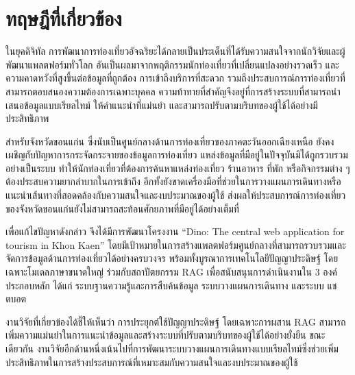 
\section{ทฤษฎีที่เกี่ยวข้อง}

ในยุคดิจิทัล การพัฒนาการท่องเที่ยวอัจฉริยะได้กลายเป็นประเด็นที่ได้รับความสนใจจากนักวิจัยและผู้พัฒนาแพลตฟอร์มทั่วโลก อันเป็นผลมาจากพฤติกรรมนักท่องเที่ยวที่เปลี่ยนแปลงอย่างรวดเร็ว และความคาดหวังที่สูงขึ้นต่อข้อมูลที่ถูกต้อง การเข้าถึงบริการที่สะดวก รวมถึงประสบการณ์การท่องเที่ยวที่สามารถตอบสนองความต้องการเฉพาะบุคคล \parencite{sousa2024} ความท้าทายที่สำคัญจึงอยู่ที่การสร้างระบบที่สามารถนำเสนอข้อมูลแบบเรียลไทม์ ให้คำแนะนำที่แม่นยำ และสามารถปรับตามบริบทของผู้ใช้ได้อย่างมีประสิทธิภาพ

สำหรับจังหวัดขอนแก่น ซึ่งนับเป็นศูนย์กลางด้านการท่องเที่ยวของภาคตะวันออกเฉียงเหนือ ยังคงเผชิญกับปัญหาการกระจัดกระจายของข้อมูลการท่องเที่ยว แหล่งข้อมูลที่มีอยู่ในปัจจุบันมิได้ถูกรวบรวมอย่างเป็นระบบ ทำให้นักท่องเที่ยวที่ต้องการค้นหาแหล่งท่องเที่ยว ร้านอาหาร ที่พัก หรือกิจกรรมต่าง ๆ ต้องประสบความยากลำบากในการเข้าถึง อีกทั้งยังขาดเครื่องมือที่ช่วยในการวางแผนการเดินทางหรือแนะนำเส้นทางที่สอดคล้องกับความสนใจและงบประมาณของผู้ใช้ ส่งผลให้ประสบการณ์การท่องเที่ยวของจังหวัดขอนแก่นยังไม่สามารถสะท้อนศักยภาพที่มีอยู่ได้อย่างเต็มที่

เพื่อแก้ไขปัญหาดังกล่าว จึงได้มีการพัฒนาโครงงาน ``Dino: The central web application for tourism in Khon Kaen'' โดยมีเป้าหมายในการสร้างแพลตฟอร์มศูนย์กลางที่สามารถรวบรวมและจัดการข้อมูลด้านการท่องเที่ยวได้อย่างครบวงจร พร้อมทั้งบูรณาการเทคโนโลยีปัญญาประดิษฐ์ โดยเฉพาะโมเดลภาษาขนาดใหญ่ ร่วมกับสถาปัตยกรรม RAG เพื่อสนับสนุนการดำเนินงานใน 3 องค์ประกอบหลัก ได้แก่ ระบบฐานความรู้และการสืบค้นข้อมูล ระบบวางแผนการเดินทาง และระบบ แชตบอต

งานวิจัยที่เกี่ยวข้องได้ชี้ให้เห็นว่า การประยุกต์ใช้ปัญญาประดิษฐ์ โดยเฉพาะการผสาน RAG สามารถเพิ่มความแม่นยำในการแนะนำข้อมูลและสร้างระบบที่ปรับตามบริบทของผู้ใช้ได้อย่างยั่งยืน \parencite{banerjee2025} ขณะเดียวกัน งานวิจัยอีกด้านหนึ่งเน้นไปที่การพัฒนาระบบวางแผนการเดินทางแบบเรียลไทม์ซึ่งช่วยเพิ่มประสิทธิภาพในการสร้างประสบการณ์ที่เหมาะสมกับความสนใจและงบประมาณของผู้ใช้ \parencite{deshmukh2025}

